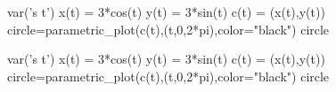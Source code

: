 \documentclass{ximera}
\begin{document}
\begin{example}
\begin{explanation}
\end{explanation}



\end{example}








\begin{sageCell}
var('s t')
x(t) = 3*cos(t)
y(t) = 3*sin(t)
c(t) = (x(t),y(t))
circle=parametric_plot(c(t),(t,0,2*pi),color="black")
circle
\end{sageCell}

\begin{sageOutput}
var('s t')
x(t) = 3*cos(t)
y(t) = 3*sin(t)
c(t) = (x(t),y(t))
circle=parametric_plot(c(t),(t,0,2*pi),color="black")
circle
\end{sageOutput}
\end{document}
